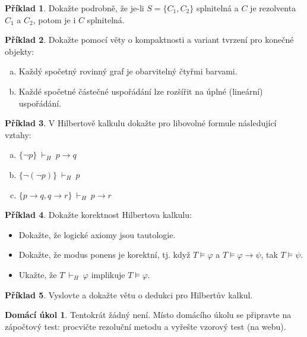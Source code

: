 \documentclass[a4paper]{article}
\theoremstyle{definition}
\newtheorem{problem}{Příklad}
\newtheorem*{ukol}{Domácí úkol}
\begin{document}
\medskip\begin{problem}
    Dokažte podrobně, že je-li $S=\{C_1,C_2\}$ splnitelná a $C$ je rezolventa $C_1$ a $C_2$, potom je i $C$ splnitelná.
\end{problem}

    
\medskip\begin{problem} Dokažte pomocí věty o kompaktnosti a variant tvrzení pro konečné objekty:
\begin{enumerate}[(a)]
    \item Každý spočetný rovinný graf je obarvitelný čtyřmi barvami.
    \item Každé spočetné částečné uspořádání lze rozšířit na úplné (lineární) uspořádání.
\end{enumerate}

\end{problem}



\medskip\begin{problem}
V Hilbertově kalkulu dokažte pro libovolné formule následující vztahy:
\begin{enumerate}[(a)]
    \item $\{\neg p\}\ \vdash_H\ p\to q$
    \item $\{\neg(\neg p)\}\ \vdash_H\ p$
    \item $\{p\to q,q \to r\}\ \vdash_H\ p\to r$
\end{enumerate}    
\end{problem}

\medskip\begin{problem}
    Dokažte korektnost Hilbertova kalkulu:
    \begin{itemize}
        \item Dokažte, že logické axiomy jsou tautologie.
        \item Dokažte, že modus ponens je korektní, tj. když $T\models\varphi$ a $T\models\varphi\to\psi$, tak $T\models\psi$.
        \item Ukažte, že $T\ \vdash_H\ \varphi$ implikuje $T\models\varphi$.
    \end{itemize}
    \end{problem}
    
\medskip\begin{problem}
    Vyslovte a dokažte větu o dedukci pro Hilbertův kalkul.
\end{problem}
    


\medskip\begin{ukol}
Tentokrát žádný není. Místo domácího úkolu se připravte na zápočtový test: procvičte rezoluční metodu a vyřešte vzorový test (na webu).
\end{ukol}
\end{document}
